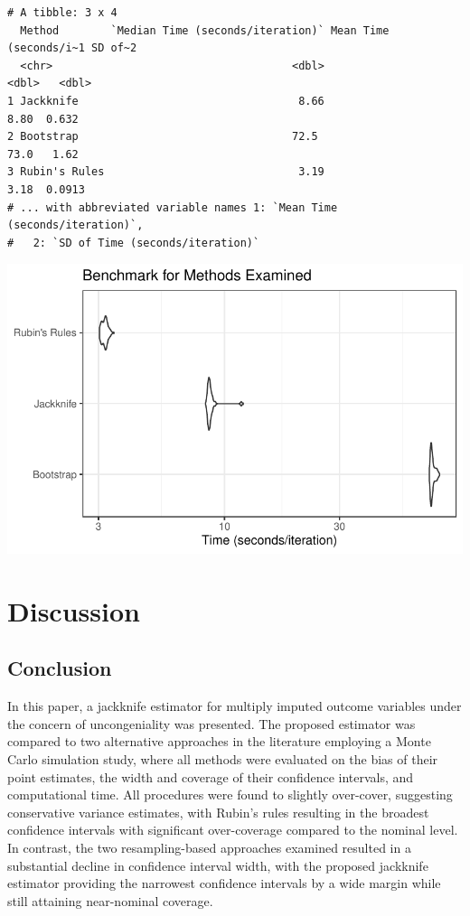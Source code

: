 \documentclass[
  letterpaper,
  DIV=11,
  numbers=noendperiod]{scrreprt}
\begin{document}
\begin{verbatim}
# A tibble: 3 x 4
  Method        `Median Time (seconds/iteration)` Mean Time (seconds/i~1 SD of~2
  <chr>                                     <dbl>                  <dbl>   <dbl>
1 Jackknife                                  8.66                   8.80  0.632 
2 Bootstrap                                 72.5                   73.0   1.62  
3 Rubin's Rules                              3.19                   3.18  0.0913
# ... with abbreviated variable names 1: `Mean Time (seconds/iteration)`,
#   2: `SD of Time (seconds/iteration)`
\end{verbatim}

\includegraphics{./results_files/figure-pdf/unnamed-chunk-7-1.pdf}


\hypertarget{discussion}{%
\chapter{Discussion}\label{discussion}}

\hypertarget{conclusion}{%
\section{Conclusion}\label{conclusion}}

In this paper, a jackknife estimator for multiply imputed outcome
variables under the concern of uncongeniality was presented. The
proposed estimator was compared to two alternative approaches in the
literature employing a Monte Carlo simulation study, where all methods
were evaluated on the bias of their point estimates, the width and
coverage of their confidence intervals, and computational time. All
procedures were found to slightly over-cover, suggesting conservative
variance estimates, with Rubin's rules resulting in the broadest
confidence intervals with significant over-coverage compared to the
nominal level. In contrast, the two resampling-based approaches examined
resulted in a substantial decline in confidence interval width, with the
proposed jackknife estimator providing the narrowest confidence
intervals by a wide margin while still attaining near-nominal coverage.
\end{document}
